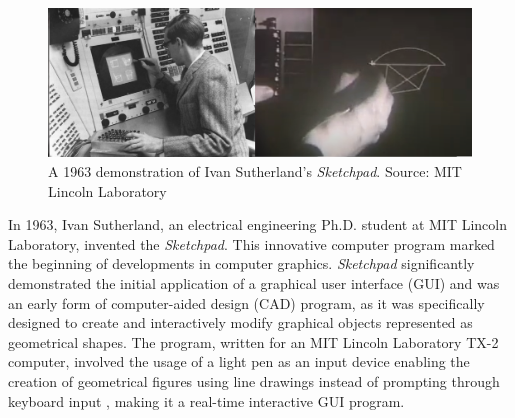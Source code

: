 \documentclass[conference]{IEEEtran}
\begin{document}
\begin{figure}[htb!]
    \centering
    \includegraphics[width=1\linewidth]{sketchpad1.png}
    \caption{A 1963 demonstration of Ivan Sutherland's \textit{Sketchpad}. Source: MIT Lincoln Laboratory}
\end{figure}
In 1963, Ivan Sutherland, an electrical engineering Ph.D. student at MIT Lincoln Laboratory, invented the \textit{Sketchpad}. This innovative computer program marked the beginning of developments in computer graphics\cite{hci}\cite{acm}. \textit{Sketchpad} significantly demonstrated the initial application of a graphical user interface (GUI) and was an early form of computer-aided design (CAD) program, as it was specifically designed to create and interactively modify graphical objects represented as geometrical shapes. The program, written for an MIT Lincoln Laboratory TX-2 computer, involved the usage of a light pen as an input device enabling the creation of geometrical figures using line drawings instead of prompting through keyboard input \cite{sutherland}, making it a real-time interactive GUI program.
\end{document}
